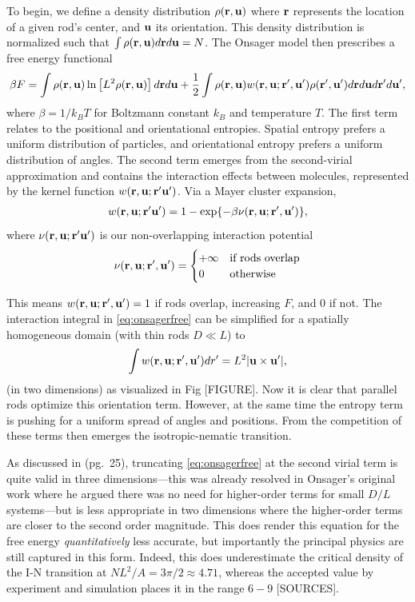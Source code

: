 To begin, we define a density distribution $\rho(\mathbf{r},\mathbf{u})$ where $\mathbf{r}$ represents the location of a given rod's center, and $\mathbf{u}$ its orientation. This density distribution is normalized such that $\int\rho(\mathbf{r},\mathbf{u})d\mathbf{r}d\mathbf{u} = N$.
The Onsager model then prescribes a free energy functional
\begin{align}
	\beta F = \int \rho(\mathbf{r},\mathbf{u}) \ln \left[ L^2\rho(\mathbf{r},\mathbf{u}) \right] d\mathbf{r}d\mathbf{u}
	+ \frac{1}{2} \int\rho(\mathbf{r},\mathbf{u}) w(\mathbf{r},\mathbf{u};\mathbf{r'},\mathbf{u'}) \rho(\mathbf{r'},\mathbf{u'}) d\mathbf{r}d\mathbf{u}d\mathbf{r'}d\mathbf{u'},
	\label{eq:onsagerfree}
\end{align}
where $\beta=1/k_BT$ for Boltzmann constant $k_B$ and temperature $T$. The first term relates to the positional and orientational entropies. Spatial entropy prefers a uniform distribution of particles, and orientational entropy prefers a uniform distribution of angles.
The second term emerges from the second-virial approximation and contains the interaction effects between molecules, represented by the kernel function $w(\mathbf{r},\mathbf{u};\mathbf{r'}\mathbf{u'})$. Via a Mayer cluster expansion, 
\begin{align}
	w(\mathbf{r},\mathbf{u};\mathbf{r'}\mathbf{u'}) = 1 - \exp\{-\beta \nu(\mathbf{r},\mathbf{u}; \mathbf{r'},\mathbf{u'})\},
\end{align}
where $\nu(\mathbf{r},\mathbf{u}; \mathbf{r'}\mathbf{u'})$ is our non-overlapping interaction potential
\begin{align}
	\nu(\mathbf{r},\mathbf{u}; \mathbf{r'},\mathbf{u'}) = 
	\begin{cases}
	+\infty & \text{if rods overlap}\\
	0 & \text{otherwise}
	\end{cases}
\end{align}

This means $w(\mathbf{r},\mathbf{u}; \mathbf{r'},\mathbf{u'}) = 1$ if rods overlap, increasing $F$, and $0$ if not. The interaction integral in \ref{eq:onsagerfree} can be simplified for a spatially homogeneous domain (with thin rods $D\ll L$) to
\begin{align}
	\int w(\mathbf{r},\mathbf{u}; \mathbf{r'},\mathbf{u'})dr'
	= L^2|\mathbf{u}\times\mathbf{u'}|,
\end{align}
(in two dimensions) as visualized in Fig [FIGURE]. Now it is clear that parallel rods optimize this orientation term. However, at the same time the entropy term is pushing for a uniform spread of angles and positions. From the competition of these terms then emerges the isotropic-nematic transition.

As discussed in \cite{chen2016theory} (pg.\ 25), truncating \ref{eq:onsagerfree} at the second virial term is quite valid in three dimensions---this was already resolved in Onsager's original work where he argued there was no need for higher-order terms for small $D/L$ systems---but is less appropriate in two dimensions where the higher-order terms are closer to the second order magnitude. This does render this equation for the free energy \textit{quantitatively} less accurate, but importantly the principal physics are still captured in this form. Indeed, this does underestimate the critical density of the I-N transition at $NL^2/A = 3\pi/2 \approx 4.71$, whereas the accepted value by experiment and simulation places it in the range $6-9$ [SOURCES].

